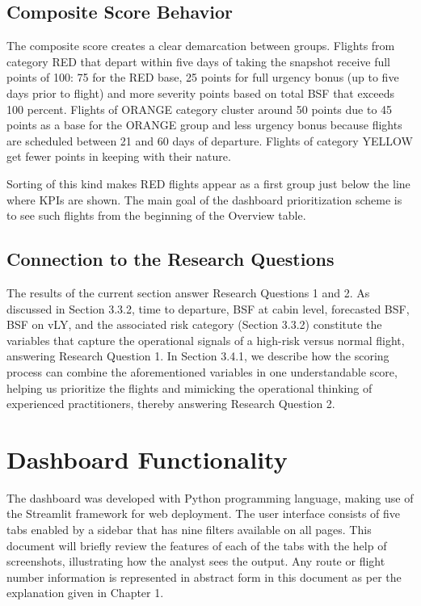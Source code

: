 \subsection{Composite Score Behavior}

The composite score creates a clear demarcation between groups. Flights from category RED that depart within five days of taking the snapshot receive full points of 100: 75 for the RED base, 25 points for full urgency bonus (up to five days prior to flight) and more severity points based on total BSF that exceeds 100 percent. Flights of ORANGE category cluster around 50 points due to 45 points as a base for the ORANGE group and less urgency bonus because flights are scheduled between 21 and 60 days of departure. Flights of category YELLOW get fewer points in keeping with their nature.

Sorting of this kind makes RED flights appear as a first group just below the line where KPIs are shown. The main goal of the dashboard prioritization scheme is to see such flights from the beginning of the Overview table.

\subsection{Connection to the Research Questions}

The results of the current section answer Research Questions 1 and 2. As discussed in Section 3.3.2, time to departure, BSF at cabin level, forecasted BSF, BSF on vLY, and the associated risk category (Section 3.3.2) constitute the variables that capture the operational signals of a high-risk versus normal flight, answering Research Question 1. In Section 3.4.1, we describe how the scoring process can combine the aforementioned variables in one understandable score, helping us prioritize the flights and mimicking the operational thinking of experienced practitioners, thereby answering Research Question 2.

\section{Dashboard Functionality}

The dashboard was developed with Python programming language, making use of the Streamlit framework for web deployment. The user interface consists of five tabs enabled by a sidebar that has nine filters available on all pages. This document will briefly review the features of each of the tabs with the help of screenshots, illustrating how the analyst sees the output. Any route or flight number information is represented in abstract form in this document as per the explanation given in Chapter 1.

